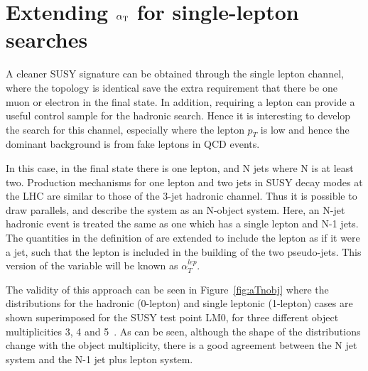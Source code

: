 \section{Extending $\alpha_{\text{T}}$ for single-lepton searches}
\label{sec:lalt}
A cleaner SUSY signature can be obtained through the single lepton channel, where the topology is identical save the extra requirement that there be one muon or electron in the final state. In addition, requiring a lepton can provide a useful control sample for the hadronic search. Hence it is interesting to develop the \alt search for this channel, especially where the lepton $p_{T}$ is low and hence the dominant background is from fake leptons in QCD events. 

In this case, in the final state there is one lepton, and N jets where N is at least two. Production mechanisms for one lepton and two jets in SUSY decay modes at the LHC are similar to those of the 3-jet hadronic channel. Thus it is possible to draw parallels, and describe the system as an N-object system. Here, an N-jet hadronic event is treated the same as one which has a single lepton and N-1 jets.  The quantities in the definition of \alt are extended to include the lepton as if it were a jet, such that the lepton is included in the building of the two pseudo-jets. This version of the variable will be known as $\alpha^{lep}_{T}$.

The validity of this approach can be seen in Figure~\ref{fig:aTnobj} where the \alt distributions for the hadronic (0-lepton) and single leptonic (1-lepton) cases are shown superimposed for the SUSY test point LM0, for three different object multiplicities 3, 4 and 5~\cite{an2009_188}. As can be seen, although the shape of the \alt distributions change with the object multiplicity, there is a good agreement between the N jet system and the N-1 jet plus lepton system. 

